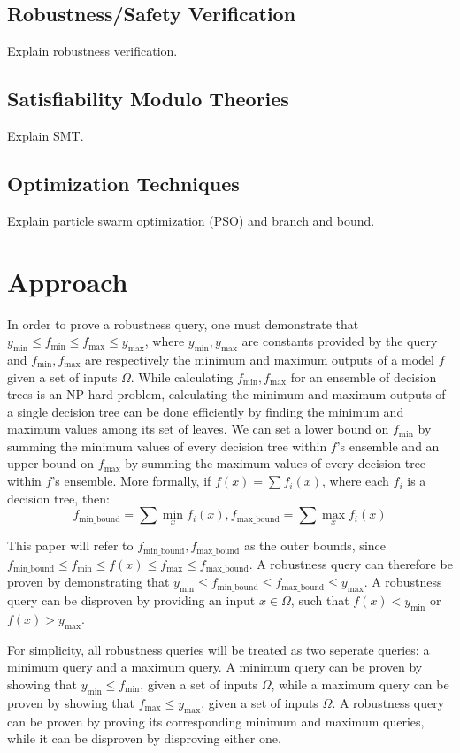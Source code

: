 \documentclass[pageno]{jpaper}
\newcommand{\ymin}{y_{\textrm{min}}}
\newcommand{\ymax}{y_{\textrm{max}}}
\newcommand{\fmin}{f_{\textrm{min}}}
\newcommand{\fmax}{f_{\textrm{max}}}
\newcommand{\fminb}{f_{\textrm{min\_bound}}}
\newcommand{\fmaxb}{f_{\textrm{max\_bound}}}
\begin{document}
\begin{doublespacing}
\subsection{Robustness/Safety Verification}
Explain robustness verification.

\subsection{Satisfiability Modulo Theories}
Explain SMT.

\subsection{Optimization Techniques}
Explain particle swarm optimization (PSO) and branch and bound.

\section{Approach}
In order to prove a robustness query, one must demonstrate that $\ymin \le \fmin \le \fmax \le \ymax$, where $\ymin, \ymax$ are constants provided by the query and $\fmin, \fmax$ are respectively the minimum and maximum outputs of a model $f$ given a set of inputs $\Omega$. While calculating $\fmin, \fmax$ for an ensemble of decision trees is an NP-hard problem, calculating the minimum and maximum outputs of a single decision tree can be done efficiently by finding the minimum and maximum values among its set of leaves. We can set a lower bound on $\fmin$ by summing the minimum values of every decision tree within $f$'s ensemble and an upper bound on $\fmax$ by summing the maximum values of every decision tree within $f$'s ensemble. More formally, if $f(x) = \sum f_i (x)$, where each $f_i$ is a decision tree, then:
$$\fminb = \sum \min_x f_i (x), \fmaxb = \sum \max_x f_i (x)$$

This paper will refer to $\fminb, \fmaxb$ as the outer bounds, since $\fminb \le \fmin \le f(x) \le \fmax \le \fmaxb$. A robustness query can therefore be proven by demonstrating that $\ymin \le \fminb \le \fmaxb \le \ymax$. A robustness query can be disproven by providing an input $x \in \Omega$, such that $f(x) < \ymin$ or $f(x) > \ymax$.

For simplicity, all robustness queries will be treated as two seperate queries: a minimum query and a maximum query. A minimum query can be proven by showing that $\ymin \le \fmin$, given a set of inputs $\Omega$, while a maximum query can be proven by showing that $\fmax \le \ymax$, given a set of inputs $\Omega$. A robustness query can be proven by proving its corresponding minimum and maximum queries, while it can be disproven by disproving either one.


\end{doublespacing}
\end{document}
